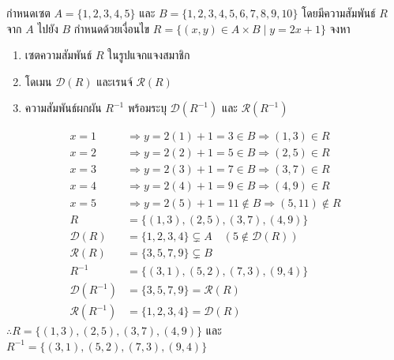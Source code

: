 \begin{ex}
\label{ex:domain-range-equation}
กำหนดเซต $A = \{1, 2, 3, 4, 5\}$ และ $B = \{1, 2, 3, 4, 5, 6, 7, 8, 9, 10\}$ โดยมีความสัมพันธ์ $R$ จาก $A$ ไปยัง $B$ กำหนดด้วยเงื่อนไข $R = \{(x,y) \in A \times B \mid y = 2x + 1\}$ จงหา
\begin{enumerate}[label=\textbf{\arabic*.}]
    \item เซตความสัมพันธ์ $R$ ในรูปแจกแจงสมาชิก
    \item โดเมน $\mathcal{D}(R)$ และเรนจ์ $\mathcal{R}(R)$
    \item ความสัมพันธ์ผกผัน $R^{-1}$ พร้อมระบุ $\mathcal{D}(R^{-1})$ และ $\mathcal{R}(R^{-1})$
\end{enumerate}
\end{ex}
\begin{solution}
\begin{align*}
x = 1 &\Rightarrow y = 2(1)+1 = 3 \in B \Rightarrow (1,3) \in R\\
x = 2 &\Rightarrow y = 2(2)+1 = 5 \in B \Rightarrow (2,5) \in R\\
x = 3 &\Rightarrow y = 2(3)+1 = 7 \in B \Rightarrow (3,7) \in R\\
x = 4 &\Rightarrow y = 2(4)+1 = 9 \in B \Rightarrow (4,9) \in R\\
x = 5 &\Rightarrow y = 2(5)+1 = 11 \notin B \Rightarrow (5,11) \notin R\\
R &= \{(1,3),(2,5),(3,7),(4,9)\}\\
\mathcal{D}(R) &= \{1,2,3,4\} \subsetneq A \quad (5 \notin \mathcal{D}(R))\\
\mathcal{R}(R) &= \{3,5,7,9\} \subsetneq B\\
R^{-1} &= \{(3,1),(5,2),(7,3),(9,4)\}\\
\mathcal{D}(R^{-1}) &= \{3,5,7,9\} = \mathcal{R}(R)\\
\mathcal{R}(R^{-1}) &= \{1,2,3,4\} = \mathcal{D}(R)
\end{align*}
$\therefore R = \{(1,3),(2,5),(3,7),(4,9)\}$ และ $R^{-1} = \{(3,1),(5,2),(7,3),(9,4)\}$ \solhere
\end{solution}

